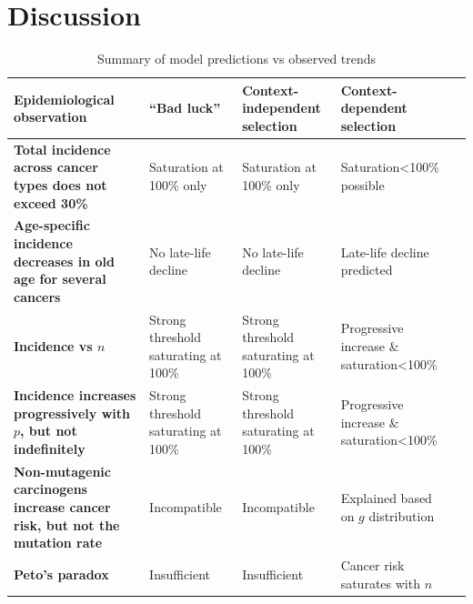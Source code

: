 \documentclass[9pt,twocolumn,twoside]{pnas-new}
\begin{document}
\section*{Discussion}
%
\begin{table}[tbhp]
\centering
\caption{Summary of model predictions vs observed trends}
\begin{tabular}{p{5cm}p{4cm}p{4cm}p{3.5cm}p{7cm}}
\textbf{Epidemiological observation} & ``Bad luck'' & Context-independent selection & Context-dependent selection \\
\midrule
\textbf{Total incidence across cancer types does not exceed 30\%} & Saturation at 100\% only & Saturation at 100\% only & Saturation<100\% possible \\
\textbf{Age-specific incidence decreases in old age for several cancers} & No late-life decline & No late-life decline & Late-life decline predicted \\
\textbf{Incidence vs $n$} & Strong threshold saturating at 100\% & Strong threshold saturating at 100\% & Progressive increase \& saturation<100\% \\
\textbf{Incidence increases progressively with $p$, but not indefinitely} & Strong threshold saturating at 100\% & Strong threshold saturating at 100\% & Progressive increase \& saturation<100\% \\
\textbf{Non-mutagenic carcinogens increase cancer risk, but not the mutation rate} & Incompatible & Incompatible & Explained based on $g$ distribution \\
\textbf{Peto's paradox} & Insufficient & Insufficient & Cancer risk saturates with $n$ \\
\bottomrule
\end{tabular}
\end{table}
\end{document}
